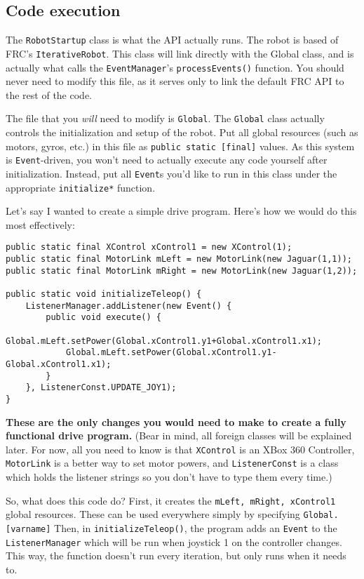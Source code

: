 \documentclass[a4paper]{article}
\begin{document}
\subsection{Code execution}The \lstinline{RobotStartup} class is what the API actually runs. The robot is based of FRC's \lstinline{IterativeRobot}. This class will link directly with the Global class, and is actually what calls the \lstinline{EventManager}'s \lstinline{processEvents()} function. You should never need to modify this file, as it serves only to link the default FRC API to the rest of the code.

The file that you \textit{will} need to modify is \lstinline{Global}. The \lstinline{Global} class actually controls the initialization and setup of the robot. Put all global resources (such as motors, gyros, etc.) in this file as \lstinline{public static [final]} values. As this system is \lstinline{Event}-driven, you won't need to actually execute any code yourself after initialization. Instead, put all \lstinline{Event}s you'd like to run in this class under the appropriate \lstinline{initialize*} function.

Let's say I wanted to create a simple drive program. Here's how we would do this most effectively:

\begin{lstlisting}
public static final XControl xControl1 = new XControl(1);
public static final MotorLink mLeft = new MotorLink(new Jaguar(1,1));
public static final MotorLink mRight = new MotorLink(new Jaguar(1,2));

public static void initializeTeleop() {
    ListenerManager.addListener(new Event() {
        public void execute() {
            Global.mLeft.setPower(Global.xControl1.y1+Global.xControl1.x1);
            Global.mLeft.setPower(Global.xControl1.y1-Global.xControl1.x1);
        }
    }, ListenerConst.UPDATE_JOY1);
}\end{lstlisting}

\textbf{These are the only changes you would need to make to create a fully functional drive program.} (Bear in mind, all foreign classes will be explained later. For now, all you need to know is that \lstinline{XControl} is an XBox 360 Controller, \lstinline{MotorLink} is a better way to set motor powers, and \lstinline{ListenerConst} is a class which holds the listener strings so you don't have to type them every time.)

So, what does this code do? First, it creates the \lstinline{mLeft, mRight, xControl1} global resources. These can be used everywhere simply by specifying \lstinline{Global.[varname]} Then, in \lstinline{initializeTeleop()}, the program adds an \lstinline{Event} to the \lstinline{ListenerManager} which will be run when joystick 1 on the controller changes. This way, the function doesn't run every iteration, but only runs when it needs to.
\end{document}
